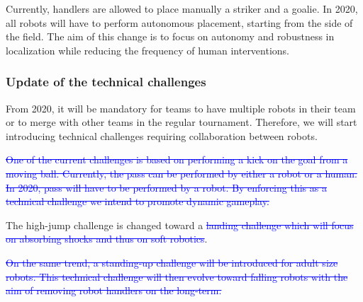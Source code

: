 \documentclass{article}
\newcommand{\removed}[1]{\textcolor{blue}{\sout{#1}}}
\newcommand{\added}[1]{{\color{magenta}{#1}}}
\begin{document}
Currently, handlers are allowed to place manually a striker and a goalie.
In 2020, all robots will have to perform autonomous placement,
starting from the side of the field.
The aim of this change is to focus on autonomy and robustness in localization
while reducing the frequency of human interventions.

\subsubsection{Update of the technical challenges}

From 2020, it will be mandatory for teams to have multiple robots in their team
or to merge with other teams in the regular tournament.
Therefore, we will start introducing technical challenges requiring collaboration between robots.

\added{
  For KidSize a collaborative localization challenge replaces the push-recovery.
  This challenge requires a blinded robot to kick the ball to the goal based on
  the information provided by another robot.%
}


\removed{
One of the current challenges is based on performing a kick on the goal from a moving ball.
Currently, the pass can be performed by either a robot or a human.
In 2020, pass will have to be performed by a robot.
By enforcing this as a technical challenge we intend to promote dynamic gameplay.%
}

The high-jump challenge is changed toward a \added{Parkour challenge where the robot
has to go up on a platform and then go down without falling}
\removed{landing challenge which will focus on absorbing shocks and thus on soft robotics}.

\removed{
On the same trend, a standing-up challenge will be introduced for adult size robots.
This technical challenge will then evolve toward falling robots with the aim of removing
robot handlers on the long-term.%
}
\end{document}
